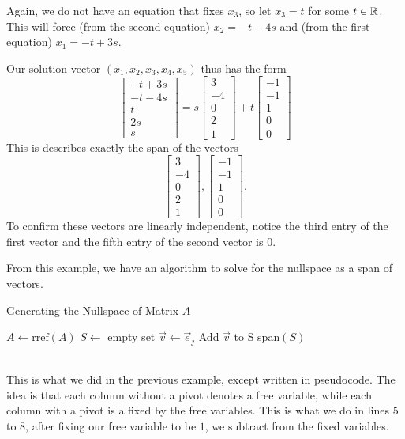 Again, we do not have an equation that fixes $x_3$, so let $x_3=t$ for some $t\in\mathbb{R}$.
This will force (from the second equation) $x_2= -t-4s$ and (from the first equation) $x_1 = -t+3s$.

Our solution vector $(x_1,x_2,x_3,x_4,x_5)$ thus has the form \[
\begin{bmatrix}
	-t+3s\\ -t-4s\\ t\\ 2s\\ s
\end{bmatrix}= s\begin{bmatrix}
	3 \\ -4 \\ 0 \\ 2 \\ 1
\end{bmatrix} + t \begin{bmatrix}
	-1 \\ -1 \\ 1 \\0 \\0
\end{bmatrix}
\]
This is describes exactly the span of the vectors \[
	\begin{bmatrix}
		3 \\ -4 \\ 0 \\ 2 \\ 1
	\end{bmatrix} ,
	\begin{bmatrix}
		-1 \\ -1 \\ 1 \\0 \\0
	\end{bmatrix}.
\]
To confirm these vectors are linearly independent, notice the third entry of the first vector and the fifth entry of the second vector is $0$.

From this example, we have an algorithm to solve for the nullspace as a span of vectors.
\begin{algorithm}
\caption{Generating the Nullspace of Matrix $A$}

	$A\gets \textrm{rref}(A)$
	 $S\gets$ empty set
	 {
		 $\vec{v} \gets \vec{e}_j$
		Add $\vec{v}$ to S
	 }
	\Return span$(S)$
\end{algorithm}
\\
This is what we did in the previous example, except written in pseudocode.
The idea is that each column without a pivot denotes a free variable, while each column with a pivot is a fixed by the free variables.
This is what we do in lines $5$ to $8$, after fixing our free variable to be $1$, we subtract from the fixed variables. 

